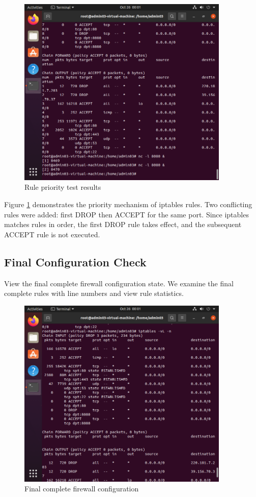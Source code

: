\documentclass[12pt,a4paper]{article}
\begin{document}
\begin{figure}[H]
    \centering
    \includegraphics[width=0.9\textwidth]{11_rule_priority.png}
    \caption{Rule priority test results}
    \label{fig:rule_priority}
\end{figure}

Figure \ref{fig:rule_priority} demonstrates the priority mechanism of iptables rules. Two conflicting rules were added: first DROP then ACCEPT for the same port. Since iptables matches rules in order, the first DROP rule takes effect, and the subsequent ACCEPT rule is not executed.

\subsection{Final Configuration Check}

View the final complete firewall configuration state. We examine the final complete rules with line numbers and view rule statistics.

\begin{figure}[H]
    \centering
    \includegraphics[width=0.9\textwidth]{12_final_configuration.png}
    \caption{Final complete firewall configuration}
    \label{fig:final_configuration}
\end{figure}
\end{document}
